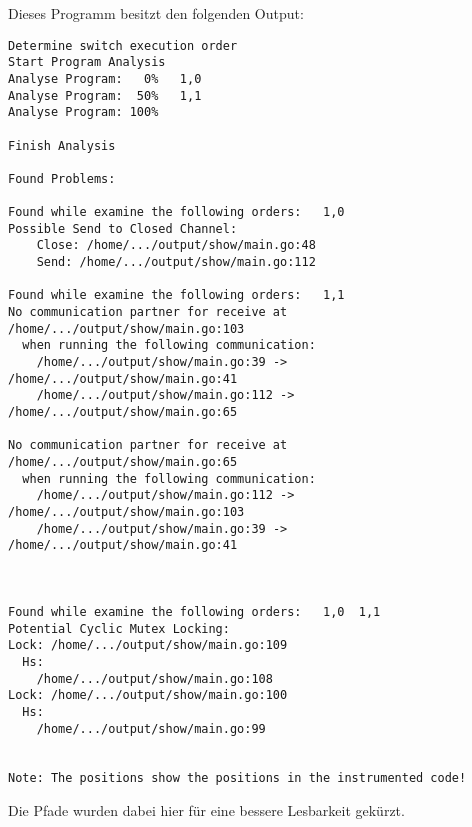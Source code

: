 Dieses Programm besitzt den folgenden Output:
\begin{verbatim}
Determine switch execution order
Start Program Analysis
Analyse Program:   0%   1,0
Analyse Program:  50%   1,1
Analyse Program: 100%

Finish Analysis

Found Problems:

Found while examine the following orders:   1,0
Possible Send to Closed Channel:
    Close: /home/.../output/show/main.go:48
    Send: /home/.../output/show/main.go:112

Found while examine the following orders:   1,1
No communication partner for receive at /home/.../output/show/main.go:103 
  when running the following communication:
    /home/.../output/show/main.go:39 -> /home/.../output/show/main.go:41
    /home/.../output/show/main.go:112 -> /home/.../output/show/main.go:65

No communication partner for receive at /home/.../output/show/main.go:65 
  when running the following communication:
    /home/.../output/show/main.go:112 -> /home/.../output/show/main.go:103
    /home/.../output/show/main.go:39 -> /home/.../output/show/main.go:41



Found while examine the following orders:   1,0  1,1
Potential Cyclic Mutex Locking:
Lock: /home/.../output/show/main.go:109
  Hs:
    /home/.../output/show/main.go:108
Lock: /home/.../output/show/main.go:100
  Hs:
    /home/.../output/show/main.go:99


Note: The positions show the positions in the instrumented code!
\end{verbatim}
Die Pfade wurden dabei hier für eine bessere Lesbarkeit gekürzt. 
